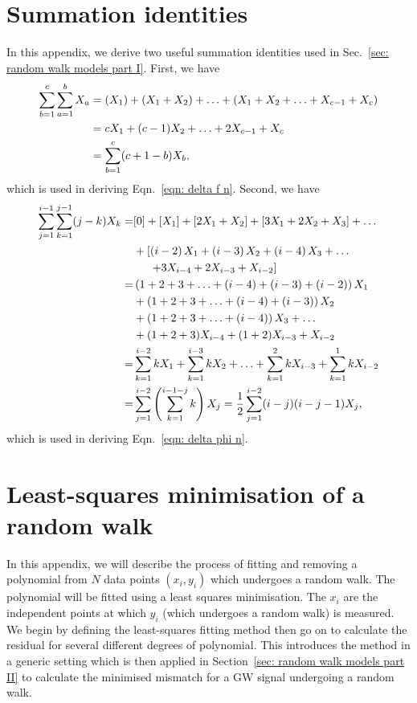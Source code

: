 \documentclass[../full_thesis/full_thesis.tex]{subfiles}
\begin{document}
\begin{subappendices}

\section{Summation identities}
\label{sec: summation identities}
In this appendix, we derive two useful summation identities used in
Sec.~\ref{sec: random walk models part I}. First, we have
\begin{align}
\sum_{b=1}^{c}\sum_{a=1}^{b} X_{a} & = \left( X_{1}\right)
 + \left( X_{1} + X_{2} \right) + \ldots  +\left( X_{1} + X_{2}
 + \ldots + X_{c-1} + X_{c}\right)\\
& = c X_{1} + (c-1)X_{2} + \ldots + 2 X_{c-1} + X_{c} \\
& = \sum_{b=1}^{c}(c+1-b)X_{b},
\label{eqn: SI 1}
\end{align}
which is used in deriving Eqn.~\eqref{eqn: delta f n}. Second, we have
\begin{align}
\sum_{j=1}^{i-1}\sum_{k=1}^{j-1}(j-k)X_{k} = & [0] + \left[ X_{1}\right]
+ \left[2X_{1} + X_{2} \right] + \left[3X_{1} + 2X_{2} +X_{3}\right]
+ \ldots  \nonumber \\
& + \left[\left(i-2\right)X_{1} + \left(i-3\right)X_{2}
+ \left(i-4\right)X_{3} + \ldots \right. \nonumber \\
& \left. \hspace{5mm}+ 3X_{i-4} + 2X_{i-3} + X_{i-2}\right]  \\
= & \left(1 + 2 + 3 + \ldots +  (i-4) + (i-3) + (i-2)\right)X_{1} \nonumber  \\
& + \left(1 + 2 + 3 + \ldots +(i-4) + (i-3) \right)X_{2}  \nonumber \\
& + \left(1 + 2 + 3 + \ldots + (i-4) \right)X_{3} + \ldots  \nonumber \\
& + (1 + 2 + 3)X_{i-4} + (1+2)X_{i-3} + X_{i-2}  \\
= & \sum_{k=1}^{i-2}k X_{1} + \sum_{k=1}^{i-3}k X_{2}  + \ldots + \sum_{k=1}^{2}k X_{i-3}
+ \sum_{k=1}^{1}kX_{i-2}  \\
= & \sum_{j=1}^{i-2}\left(\sum_{k=1}^{i-1-j}k\right)X_{j} =
\frac{1}{2}\sum_{j=1}^{i-2}(i-j)(i-j-1)X_{j},
\label{eqn: SI 2}
\end{align}
which is used in deriving Eqn.~\eqref{eqn: delta phi n}.


\section{Least-squares minimisation of a random walk}
\label{sec: least squares minimisation of a random walk}
In this appendix, we will describe the process of fitting and
removing a polynomial from $N$ data points $(x_i, y_i)$ which undergoes a
random walk. The polynomial will be fitted using a least squares minimisation.
The $x_i$ are the independent points at which $y_i$ (which undergoes a random
walk) is measured. We begin by defining the least-squares fitting method then
go on to calculate the residual for several different degrees of polynomial.
This introduces the method in a generic setting which is then applied in
Section~\ref{sec: random walk models part II} to calculate the minimised mismatch for a
GW signal undergoing a random walk.


\end{subappendices}
\end{document}
